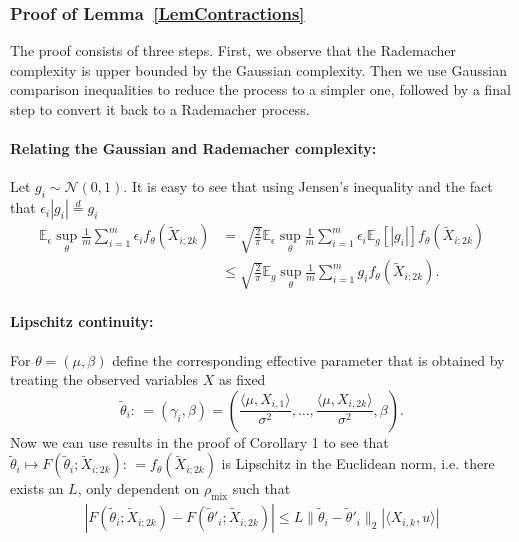 \documentclass[twoside,11pt]{article}
\newcommand{\NORMAL}{\ensuremath{\mathcal{N}}}
\def\EE{ \mathbb{E} }
\newcommand{\norm}[1]{\ensuremath{\|#1\|_2}}
\newcommand{\mixcoef}{\ensuremath{\rho_{\mathrm{mix}}}}
\newcommand{\paramobs}{\mu}
\newcommand{\paramtrans}{\beta}
\newcommand{\paramjoint}{\theta}
\newcommand{\paramgamma}{\gamma}
\newcommand{\defn}{: \, = }
\newcommand{\Xtil}{\ensuremath{\widetilde{X}}}
\newcommand{\funcproc}{f_{\paramjoint}}
\newcommand{\funcprocgamma}[1]{F(#1;\blockXi)}
\newcommand{\blockXi}{\Xtil_{i;2k}}
\newcommand{\lipcont}{\ensuremath{L}}
\newcommand{\paramjointgamma}{\tilde{\paramjoint}}
\begin{document}

\subsubsection{Proof of Lemma~\ref{LemContractions}}

The proof consists of three steps. First, we observe that the
Rademacher complexity is upper bounded by the Gaussian
complexity. Then we use Gaussian comparison inequalities to reduce the
process to a simpler one, followed by a final step to convert it back
to a Rademacher process.


\paragraph{Relating the Gaussian and Rademacher complexity:}

Let $g_i \sim \NORMAL(0,1)$. It is easy to see that using Jensen's
inequality and the fact that $\epsilon_i |g_i| \overset{d}{=} g_i$
\begin{align*}
\EE_{\epsilon} \sup_{\paramjoint} \frac{1}{m} \sum_{i=1}^m \epsilon_i
\funcproc(\blockXi) &= \sqrt{\frac{2}{\pi}} \EE_{\epsilon}
\sup_{\paramjoint} \frac{1}{m} \sum_{i=1}^m \epsilon_i \EE_g[|g_i|]
\funcproc(\blockXi)\\ 
%
& \leq \sqrt{\frac{2}{\pi}} \EE_{g} \sup_{\paramjoint}\frac{1}{m}
\sum_{i=1}^m g_i \funcproc(\blockXi).
\end{align*}

\paragraph{Lipschitz continuity:}
For $\paramjoint = (\mu,\beta)$ define the corresponding effective
parameter that is obtained by treating the observed variables 
$X$ as fixed
\begin{equation}
\paramjointgamma_i \defn (\paramgamma_i, \paramtrans) = (\frac{\langle
  \paramobs, X_{i,1} \rangle}{\sigma^2}, \dots,
\frac{\langle\paramobs, X_{i,2k}\rangle}{\sigma^2}, \paramtrans).
\end{equation}
Now we can use results in the proof of Corollary 1 to see that
$\paramjointgamma_i \mapsto \funcprocgamma{\paramjointgamma_i} \defn
\funcproc(\blockXi)$ is Lipschitz in the Euclidean norm, i.e. there
exists an $\lipcont$, only dependent on $\mixcoef$ such that
\begin{align}
\label{EqnLipschitz}
|\funcprocgamma{\paramjointgamma_i} -
\funcprocgamma{\paramjointgamma'_i}| \leq \lipcont
\norm{\paramjointgamma_i- \paramjointgamma'_i} |\langle X_{i,k}
,u\rangle|
\end{align}
\end{document}

